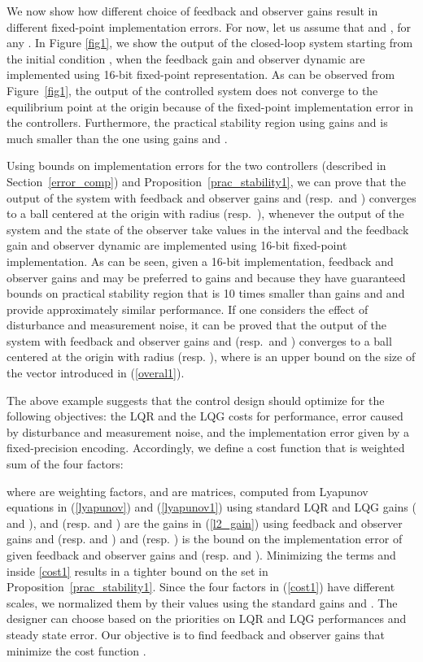 \documentclass{amsart}
\numberwithin{equation}{section}
\def\myparagraph#1{{\smallskip\noindent{\bf #1}}}
\begin{document}
We now show how different choice of feedback and observer gains result in different fixed-point implementation errors.
For now, let us assume that  and , for any . 
In Figure \ref{fig1}, we show the output of the closed-loop system starting from the 
initial condition , 
when the feedback gain and observer dynamic are implemented using 16-bit fixed-point representation. 
As can be observed from Figure~\ref{fig1}, 
the output of the controlled system 
does not converge to the equilibrium point at the origin because 
of the fixed-point implementation error in the controllers. Furthermore, the practical stability region using gains  and  is much smaller than the one using gains  and .

Using bounds on implementation errors for the two controllers (described in Section~\ref{error_comp})
and Proposition~\ref{prac_stability1}, we can prove that the output of the system with feedback and observer gains  and  
(resp.\  and ) converges to a ball centered at the origin with radius  (resp.\ ), 
whenever the output of the system and the state of the observer take values in the interval  and the feedback gain and observer dynamic are implemented 
using 16-bit fixed-point implementation. 
As can be seen, given a 16-bit implementation, feedback and observer gains  and  may be preferred to gains  and  
because they have guaranteed bounds on practical stability region that is 10 times smaller than gains  and  and provide approximately similar performance. 
If one considers the effect of disturbance and measurement noise, it can be proved that the output of the system with feedback and observer gains 
 and  (resp.\  and ) converges to a ball centered at the origin with radius  (resp. ),
where  is an upper bound on the size of the vector  introduced in (\ref{overal1}).

\myparagraph{Optimization objectives}
The above example suggests that the control design should optimize for the following objectives: 
the LQR and the LQG costs for performance, error caused by disturbance and measurement noise, 
and the implementation error given by a fixed-precision encoding. 
Accordingly, we define a cost function that is weighted sum of the four factors:

where  are weighting factors,  and  are matrices, computed from Lyapunov equations in (\ref{lyapunov}) and (\ref{lyapunov1}) using standard LQR and LQG gains ( and ), 
 and  (resp.  and ) are the  gains in (\ref{l2_gain}) using feedback and observer gains  and  
(resp.  and ) and  (resp. ) is the bound on the implementation error of given feedback and observer gains 
 and  (resp.  and ). 
Minimizing the terms  and  inside \eqref{cost1} results in a tighter bound 
on the set  in Proposition~\ref{prac_stability1}. 
Since the four factors in (\ref{cost1}) have different scales, we normalized them by their values using the standard gains 
 and . 
The designer can choose  based on the priorities on LQR and LQG performances and steady state error.
Our objective is to find feedback and observer gains that minimize the cost function .
\end{document}
